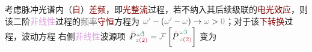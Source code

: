 考虑\textcolor{NavyBlue}{脉冲光}谱内（\textcolor{Maroon}{自}）\textcolor{Maroon}{差频}，即\textcolor{Maroon}{光整流}过程，若不纳入其后续级联的\textcolor{Maroon}{电光效应}，则该二阶\textcolor{Plum}{非线性}过程的\textcolor{gray}{频率}\textcolor{Maroon}{守恒}方程为 $ \textcolor{gray}{\omega'} - \left( \textcolor{gray}{\omega'}-\textcolor{gray}{\omega} \right) \to \textcolor{gray}{\omega} > \textcolor{gray}{0}$；对于该\textcolor{Maroon}{下转换}过程，波动方程  右侧\textcolor{Plum}{非线性}\textcolor{NavyBlue}{波源}项 $\Xint{\mathcolor{gray}{-}}{25}{\bar{P}}^{\;\! \mathcolor{gray}{\omega} \textcolor{PineGreen}{\hat{3}} }_{\;\! \mathcolor{gray}{z}  \textcolor{Maroon}{(2)}} = \mathcolor{gray}{\mathcal F} \left[ {\bar{P}}^{\;\! \mathcolor{gray}{\omega} \textcolor{PineGreen}{\hat{3}} }_{\;\! \mathcolor{gray}{z}  \textcolor{Maroon}{(2)}} \right]$ 变为
